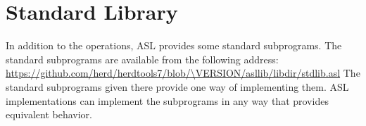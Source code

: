 \chapter{Standard Library\label{chap:StandardLibrary}}

In addition to the operations, ASL provides some standard subprograms.
The standard subprograms are available from the following address:
\url{https://github.com/herd/herdtools7/blob/\VERSION/asllib/libdir/stdlib.asl}
The standard subprograms given there provide one way of implementing them.
ASL implementations can implement the subprograms in any way that provides equivalent behavior.
